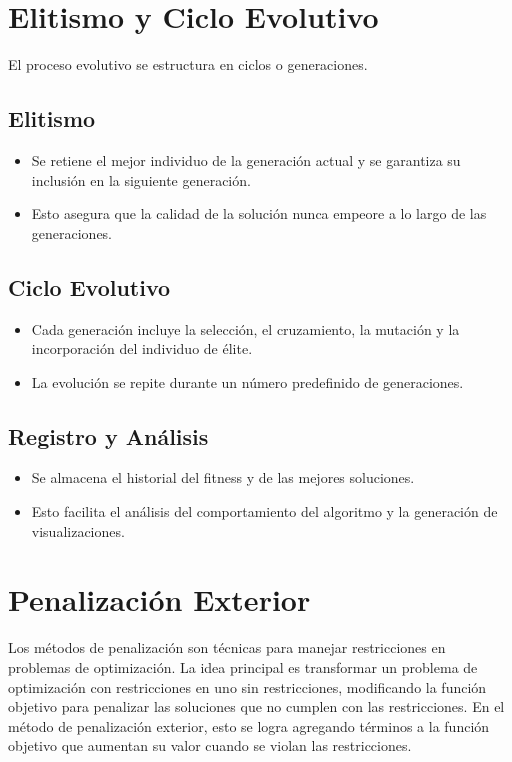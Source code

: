 \section{Elitismo y Ciclo Evolutivo}

El proceso evolutivo se estructura en ciclos o generaciones.

\subsection*{Elitismo}
\begin{itemize}
    \item Se retiene el mejor individuo de la generaci\'on actual y se garantiza su inclusi\'on en la siguiente generaci\'on.
    \item Esto asegura que la calidad de la soluci\'on nunca empeore a lo largo de las generaciones.
\end{itemize}

\subsection*{Ciclo Evolutivo}
\begin{itemize}
    \item Cada generaci\'on incluye la selecci\'on, el cruzamiento, la mutaci\'on y la incorporaci\'on del individuo de \'elite.
    \item La evoluci\'on se repite durante un n\'umero predefinido de generaciones.
\end{itemize}

\subsection*{Registro y An\'alisis}
\begin{itemize}
    \item Se almacena el historial del fitness y de las mejores soluciones.
    \item Esto facilita el an\'alisis del comportamiento del algoritmo y la generaci\'on de visualizaciones.
\end{itemize}

\section{Penalización Exterior}

Los métodos de penalización son técnicas para manejar restricciones en problemas de optimización. La idea principal es transformar un problema de optimización con restricciones en uno sin restricciones, modificando la función objetivo para penalizar las soluciones que no cumplen con las restricciones. En el método de penalización exterior, esto se logra agregando términos a la función objetivo que aumentan su valor cuando se violan las restricciones.

